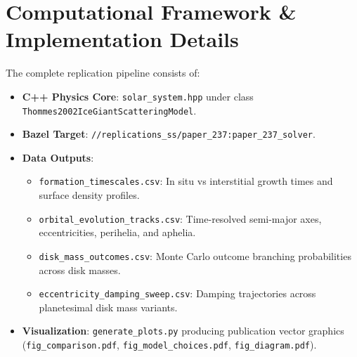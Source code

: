 \documentclass[11pt,a4paper]{article}
\begin{document}
\section{Computational Framework \& Implementation Details}
The complete replication pipeline consists of:
\begin{itemize}
    \item \textbf{C++ Physics Core}: \texttt{solar\_system.hpp} under class \texttt{Thommes2002IceGiantScatteringModel}.
    \item \textbf{Bazel Target}: \texttt{//replications\_ss/paper\_237:paper\_237\_solver}.
    \item \textbf{Data Outputs}:
    \begin{itemize}
        \item \texttt{formation\_timescales.csv}: In situ vs interstitial growth times and surface density profiles.
        \item \texttt{orbital\_evolution\_tracks.csv}: Time-resolved semi-major axes, eccentricities, perihelia, and aphelia.
        \item \texttt{disk\_mass\_outcomes.csv}: Monte Carlo outcome branching probabilities across disk masses.
        \item \texttt{eccentricity\_damping\_sweep.csv}: Damping trajectories across planetesimal disk mass variants.
    \end{itemize}
    \item \textbf{Visualization}: \texttt{generate\_plots.py} producing publication vector graphics (\texttt{fig\_comparison.pdf}, \texttt{fig\_model\_choices.pdf}, \texttt{fig\_diagram.pdf}).
\end{itemize}
\end{document}
